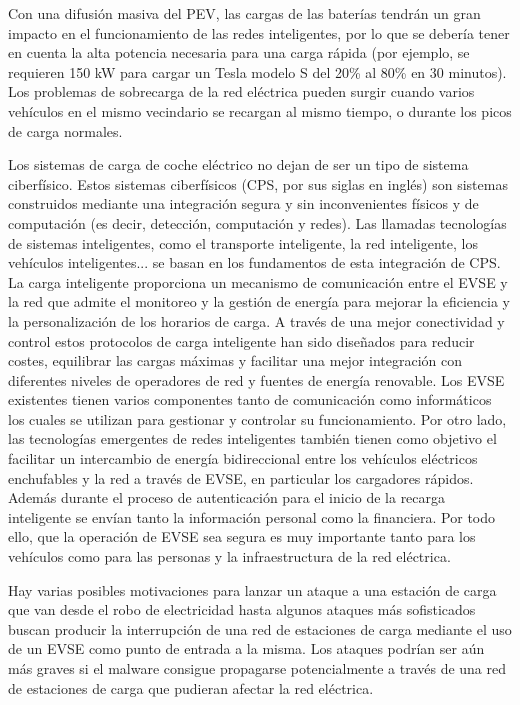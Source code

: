 \documentclass[12pt,a4paper,onecolumn,oneside]{report}
\begin{document}
Con una difusión masiva del PEV, las cargas de las baterías tendrán un gran impacto en el funcionamiento de las redes inteligentes, por lo que se debería tener en cuenta la alta potencia necesaria para una carga rápida (por ejemplo, se requieren 150 kW para cargar un Tesla modelo S del 20\% al 80\% en 30 minutos). Los problemas de sobrecarga de la red eléctrica pueden surgir cuando varios vehículos en el mismo vecindario se recargan al mismo tiempo, o durante los picos de carga normales.

Los sistemas de carga de coche eléctrico no dejan de ser un tipo de sistema ciberfísico. Estos sistemas ciberfísicos (CPS, por sus siglas en inglés) son sistemas construidos mediante una integración segura y sin inconvenientes físicos y de computación (es decir, detección, computación y redes). Las llamadas tecnologías de sistemas inteligentes, como el transporte inteligente, la red inteligente, los vehículos inteligentes... se basan en los fundamentos de esta integración de CPS. La carga inteligente proporciona un mecanismo de comunicación entre el EVSE y la red que admite el monitoreo y la gestión de energía para mejorar la eficiencia y la personalización de los horarios de carga. A través de una mejor conectividad y control estos protocolos de carga inteligente han sido diseñados para reducir costes, equilibrar las cargas máximas y facilitar una mejor integración con diferentes niveles de operadores de red y fuentes de energía renovable. Los EVSE existentes tienen varios componentes tanto de comunicación como informáticos los cuales se utilizan para gestionar y controlar su funcionamiento. Por otro lado, las tecnologías emergentes de redes inteligentes también tienen como objetivo el facilitar un intercambio de energía bidireccional entre los vehículos eléctricos enchufables y la red a través de EVSE, en particular los cargadores rápidos. Además durante el proceso de autenticación para el inicio de la recarga inteligente se envían tanto la información personal como la financiera. Por todo ello, que la operación de EVSE sea segura es muy importante tanto para los vehículos como para las personas y la infraestructura de la red eléctrica.

Hay varias posibles motivaciones para lanzar un ataque a una estación de carga que van desde el robo de electricidad hasta algunos ataques más sofisticados buscan producir la interrupción de una red de estaciones de carga mediante el uso de un EVSE como punto de entrada a la misma. Los ataques podrían ser aún más graves si el malware consigue propagarse potencialmente a través de una red de estaciones de carga que pudieran afectar la red eléctrica.
\end{document}
